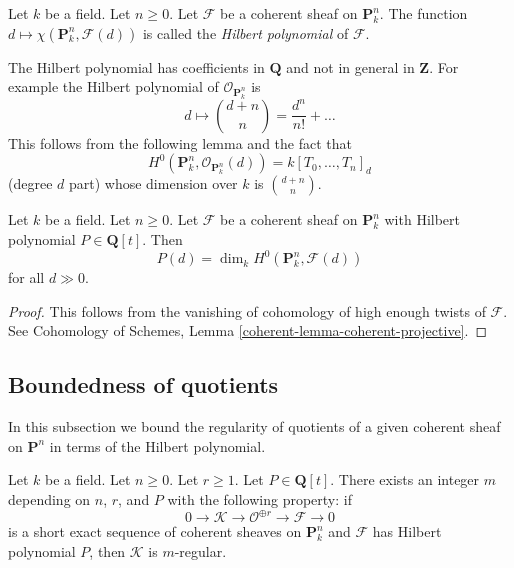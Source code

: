 \begin{definition}
\label{definition-hilbert-polynomial}
Let $k$ be a field. Let $n \geq 0$. Let $\mathcal{F}$ be a coherent sheaf
on $\mathbf{P}^n_k$. The function
$d \mapsto \chi(\mathbf{P}^n_k, \mathcal{F}(d))$ is called the
{\it Hilbert polynomial} of $\mathcal{F}$.
\end{definition}

\noindent
The Hilbert polynomial has coefficients in $\mathbf{Q}$ and not
in general in $\mathbf{Z}$. For example the Hilbert polynomial
of $\mathcal{O}_{\mathbf{P}^n_k}$ is
$$
d \longmapsto {d + n \choose n} = \frac{d^n}{n!} + \ldots
$$
This follows from the following lemma and the fact that
$$
H^0(\mathbf{P}^n_k, \mathcal{O}_{\mathbf{P}^n_k}(d)) = k[T_0, \ldots, T_n]_d
$$
(degree $d$ part) whose dimension over $k$ is ${d + n \choose n}$.

\begin{lemma}
\label{lemma-hilbert-polynomial-H0}
Let $k$ be a field. Let $n \geq 0$. Let $\mathcal{F}$ be a coherent sheaf
on $\mathbf{P}^n_k$ with Hilbert polynomial $P \in \mathbf{Q}[t]$.
Then
$$
P(d) = \dim_k H^0(\mathbf{P}^n_k, \mathcal{F}(d))
$$
for all $d \gg 0$.
\end{lemma}

\begin{proof}
This follows from the vanishing of cohomology of high enough twists
of $\mathcal{F}$. See
Cohomology of Schemes,
Lemma \ref{coherent-lemma-coherent-projective}.
\end{proof}



\subsection{Boundedness of quotients}
\label{subsection-boundedness}

\noindent
In this subsection we bound the regularity of quotients of
a given coherent sheaf on $\mathbf{P}^n$ in terms of the
Hilbert polynomial.

\begin{lemma}
\label{lemma-bound-quotients-free}
Let $k$ be a field. Let $n \geq 0$. Let $r \geq 1$. Let $P \in \mathbf{Q}[t]$.
There exists an integer $m$ depending on $n$, $r$, and $P$
with the following property: if
$$
0 \to \mathcal{K} \to \mathcal{O}^{\oplus r} \to \mathcal{F} \to 0
$$
is a short exact sequence of coherent sheaves on $\mathbf{P}^n_k$
and $\mathcal{F}$ has Hilbert polynomial $P$, then
$\mathcal{K}$ is $m$-regular.
\end{lemma}

